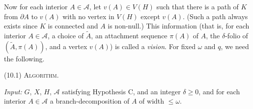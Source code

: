 Now for each interior $A \in \mathcal{A}$, let $v(A) \in V(H)$ such that there is a path of $K$ from $\partial A$ to $v(A)$ with no vertex in $V(H)$ except $v(A)$. (Such a path always exists since $K$ is connected and $A$ is non-null.) This information (that is, for each interior $A \in \mathcal{A}$, a choice of $\tilde{A}$, an attachment sequence $\pi(A)$ of $A$, the $\delta$-folio of $(\tilde{A}, \pi(A))$, and a vertex $v(A)$) is called a \textit{vision}. For fixed $\omega$ and $q$, we need the following.

\stmt
(10.1) \textsc{Algorithm}.

\textit{Input:} $G$, $X$, $H$, $\mathcal{A}$ satisfying Hypothesis C, and an integer $\delta \ge 0$, and for each interior $A \in \mathcal{A}$ a branch-decomposition of $A$ of width $\le \omega$.
